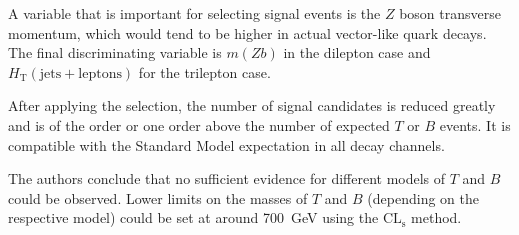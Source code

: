 A variable that is important for selecting signal events is the $Z$ boson transverse momentum, which would tend to be higher in actual vector-like quark decays.
The final discriminating variable is $m(Zb)$ in the dilepton case and $H_\text{T}(\text{jets}+\text{leptons})$ for the trilepton case.

After applying the selection, the number of signal candidates is reduced greatly and is of the order or one order above the number of expected $T$ or $B$ events.
It is compatible with the Standard Model expectation in all decay channels.

The authors conclude that no sufficient evidence for different models of $T$ and $B$ could be observed.
Lower limits on the masses of $T$ and $B$ (depending on the respective model) could be set at around \SI{700}{GeV} using the $\text{CL}_\text{s}$ method.
